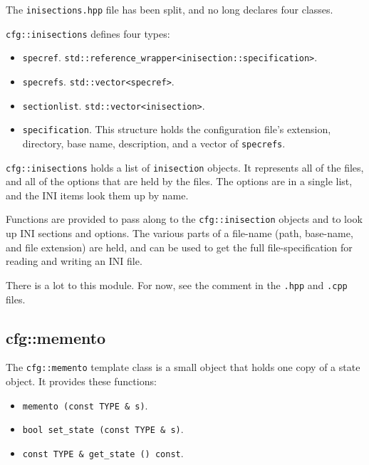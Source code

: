    The \texttt{inisections.hpp} file has been split,
   and no long declares four classes.

   \texttt{cfg::inisections} defines four types:

   \begin{itemize}
      \item \texttt{specref}.
          \texttt{std::reference\_wrapper<inisection::specification>}.
      \item \texttt{specrefs}.
          \texttt{std::vector<specref>}.
      \item \texttt{sectionlist}.
         \texttt{std::vector<inisection>}.
      \item \texttt{specification}.
         This structure holds the configuration file's extension,
         directory, base name, description, and a vector of
         \texttt{specrefs}.
   \end{itemize}

   \texttt{cfg::inisections} holds a list of \texttt{inisection} objects.
   It represents all of the files, and all of
   the options that are held by the files.
   The options are in a single list,
   and the INI items look them up by name.

   Functions are provided to pass along to the \texttt{cfg::inisection}
   objects and to look up INI sections and options.
   The various parts of a file-name (path, base-name, and file extension)
   are held, and can be used to get the full file-specification for
   reading and writing an INI file.

   There is a lot to this module.
   For now, see the comment in the \texttt{.hpp} and \texttt{.cpp} files.

\subsection{cfg::memento}
\label{subsec:cfg_namespace_memento}

   The \texttt{cfg::memento} template class is a small object that holds one
   copy of a state object.
   It provides these functions:

   \begin{itemize}
      \item \texttt{memento (const TYPE \& s)}.
      \item \texttt{bool set\_state (const TYPE \& s)}.
      \item \texttt{const TYPE \& get\_state () const}.
   \end{itemize}

